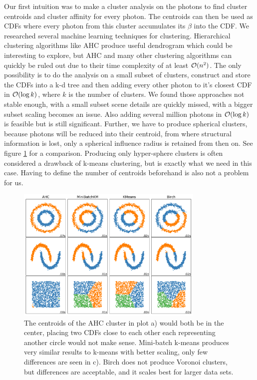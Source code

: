 Our first intuition was to make a cluster analysis on the photons to find cluster centroids and cluster affinity for every photon. The centroids can then be used as CDFs where every photon from this cluster accumulates its $\beta$ into the CDF. We researched several machine learning techniques for clustering. Hierarchical clustering algorithms like AHC produce useful dendrogram which could be interesting to explore, but AHC and many other clustering algorithms can quickly be ruled out due to their time complexity of at least $\mathcal{O}(n^2)$. The only possibility is to do the analysis on a small subset of clusters, construct and store the CDFs into a k-d tree and then adding every other photon to it's closest CDF in $\mathcal{O}(\log k)$, where $k$ is the number of clusters. We found those approaches not stable enough, with a small subset scene details are quickly missed, with a bigger subset scaling becomes an issue. Also adding several million photons in $\mathcal{O}(\log k)$ is feasible but is still significant. Further, we have to produce spherical clusters, because photons will be reduced into their centroid, from where structural information is lost, only a spherical influence radius is retained from then on. See figure \ref{fig:clustering} for a comparison. Producing only hyper-sphere clusters is often considered a drawback of k-means clustering, but is exactly what we need in this case. Having to define the number of centroids beforehand is also not a problem for us.

\begin{figure}
    \centering
    \includegraphics[width=0.8\textwidth]{figures/plots/mlclustering.pdf}
    \caption{The centroids of the AHC cluster in plot a) would both be in the center, placing two CDFs close to each other each representing another circle would not make sense. Mini-batch k-means produces very similar results to k-means with better scaling, only few differences are seen in c). Birch does not produce Voronoi clusters, but differences are acceptable, and it scales best for larger data sets.}
    \label{fig:clustering}
\end{figure}
    
